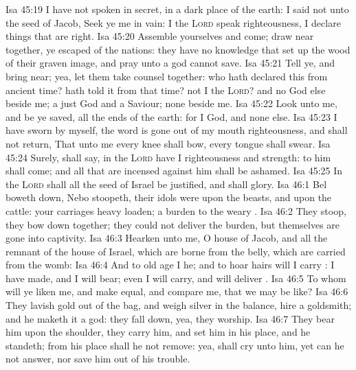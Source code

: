 \vs Isa 45:19 I have not spoken in secret, in a dark place of the earth: I said not unto the seed of Jacob, Seek ye me in vain: I the \textsc{Lord} speak righteousness, I declare things that are right.
\vs Isa 45:20 Assemble yourselves and come; draw near together, ye  escaped of the nations: they have no knowledge that set up the wood of their graven image, and pray unto a god  cannot save.
\vs Isa 45:21 Tell ye, and bring  near; yea, let them take counsel together: who hath declared this from ancient time?  hath told it from that time?  not I the \textsc{Lord}? and  no God else beside me; a just God and a Saviour;  none beside me.
\vs Isa 45:22 Look unto me, and be ye saved, all the ends of the earth: for I  God, and  none else.
\vs Isa 45:23 I have sworn by myself, the word is gone out of my mouth  righteousness, and shall not return, That unto me every knee shall bow, every tongue shall swear.
\vs Isa 45:24 Surely, shall  say, in the \textsc{Lord} have I righteousness and strength:  to him shall  come; and all that are incensed against him shall be ashamed.
\vs Isa 45:25 In the \textsc{Lord} shall all the seed of Israel be justified, and shall glory.
\vs Isa 46:1 Bel boweth down, Nebo stoopeth, their idols were upon the beasts, and upon the cattle: your carriages  heavy loaden;  a burden to the weary .
\vs Isa 46:2 They stoop, they bow down together; they could not deliver the burden, but themselves are gone into captivity.
\vs Isa 46:3 Hearken unto me, O house of Jacob, and all the remnant of the house of Israel, which are borne  from the belly, which are carried from the womb:
\vs Isa 46:4 And  to  old age I  he; and  to hoar hairs will I carry : I have made, and I will bear; even I will carry, and will deliver .
\vs Isa 46:5 To whom will ye liken me, and make  equal, and compare me, that we may be like?
\vs Isa 46:6 They lavish gold out of the bag, and weigh silver in the balance,  hire a goldsmith; and he maketh it a god: they fall down, yea, they worship.
\vs Isa 46:7 They bear him upon the shoulder, they carry him, and set him in his place, and he standeth; from his place shall he not remove: yea,  shall cry unto him, yet can he not answer, nor save him out of his trouble.
